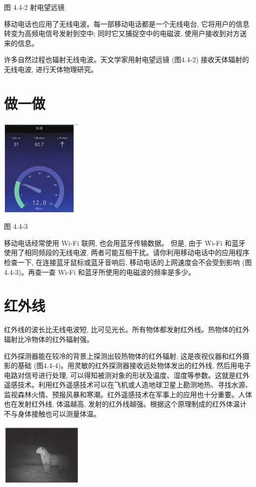 \documentclass[10pt]{article}
\begin{document}
图 4.4-2 射电望远镜

移动电话也应用了无线电波。每一部移动电话都是一个无线电台, 它将用户的信息转变为高频电信号发射到空中; 同时它又捕捉空中的电磁波, 使用户接收到对方送来的信息。

许多自然过程也辐射无线电波。天文学家用射电望远镜 (图4.4-2) 接收天体辐射的无线电波, 进行天体物理研究。

\section*{做一做}

\begin{center}
\includegraphics[max width=0.3\textwidth]{images/01910e72-c5b7-7ed5-a6d4-fb3a5faefc32_89_293957.jpg}
\end{center}

图 4.4-3

移动电话经常使用 Wi-Fi 联网, 也会用蓝牙传输数据。 但是, 由于 Wi-Fi 和蓝牙使用了相同频段的无线电波, 两者可能互相干扰。请你利用移动电话中的应用程序检查一下, 在连接蓝牙鼠标或蓝牙音响后, 移动电话的上网速度会不会受到影响 (图 4.4-3)。再查一查 Wi-Fi 和蓝牙所使用的电磁波的频率是多少。

\section*{红外线}

红外线的波长比无线电波短, 比可见光长。所有物体都发射红外线。热物体的红外辐射比冷物体的红外辐射强。

红外探测器能在较冷的背景上探测出较热物体的红外辐射, 这是夜视仪器和红外摄影的基础 (图4.4-4)。用灵敏的红外探测器接收远处物体发出的红外线, 然后用电子电路对信号进行处理, 可以得知被测对象的形状及温度、湿度等参数。这就是红外遥感技术。利用红外遥感技术可以在飞机或人造地球卫星上勘测地热、寻找水源、监视森林火情、预报风暴和寒潮。红外遥感技术在军事上的应用也十分重要。人体也在发射红外线, 体温越高, 发射的红外线越强。根据这个原理制成的红外体温计不与身体接触也可以测量体温。

\begin{center}
\includegraphics[max width=0.3\textwidth]{images/01910e72-c5b7-7ed5-a6d4-fb3a5faefc32_90_936787.jpg}
\end{center}
\end{document}
